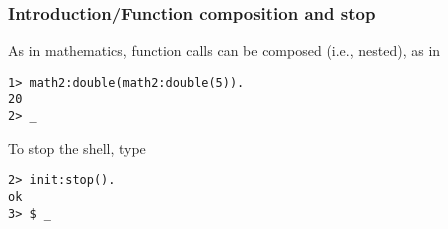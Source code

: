 %
\begin{frame}[containsverbatim]
\frametitle{Introduction/Function composition and stop}

As in mathematics, function calls can be composed (i.e., nested), as in
\begin{verbatim}
1> math2:double(math2:double(5)).
20
2> _
\end{verbatim}
To stop the \Erlang shell, type
\begin{verbatim}
2> init:stop().
ok
3> $ _
\end{verbatim}

\end{frame}
